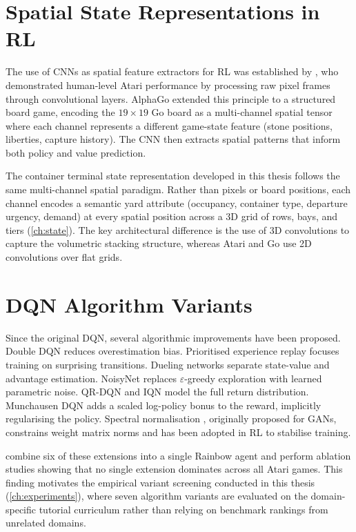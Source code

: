 \section{Spatial State Representations in RL}
\label{sec:rw:cnn}

The use of CNNs as spatial feature extractors for RL was established by \textcite{mnih2015dqn}, who demonstrated human-level Atari performance by processing raw pixel frames through convolutional layers. AlphaGo \cite{silver2016go} extended this principle to a structured board game, encoding the $19 \times 19$ Go board as a multi-channel spatial tensor where each channel represents a different game-state feature (stone positions, liberties, capture history). The CNN then extracts spatial patterns that inform both policy and value prediction.

The container terminal state representation developed in this thesis follows the same multi-channel spatial paradigm. Rather than pixels or board positions, each channel encodes a semantic yard attribute (occupancy, container type, departure urgency, demand) at every spatial position across a 3D grid of rows, bays, and tiers (\cref{ch:state}). The key architectural difference is the use of 3D convolutions \cite{ji20133dcnn} to capture the volumetric stacking structure, whereas Atari and Go use 2D convolutions over flat grids.

\section{DQN Algorithm Variants}
\label{sec:rw:dqn}

Since the original DQN, several algorithmic improvements have been proposed. Double DQN \cite{hasselt2016ddqn} reduces overestimation bias. Prioritised experience replay \cite{schaul2016per} focuses training on surprising transitions. Dueling networks \cite{wang2016dueling} separate state-value and advantage estimation. NoisyNet \cite{fortunato2018noisy} replaces $\varepsilon$-greedy exploration with learned parametric noise. QR-DQN \cite{dabney2018distributional} and IQN \cite{dabney2018implicit} model the full return distribution. Munchausen DQN \cite{vieillard2020munchausen} adds a scaled log-policy bonus to the reward, implicitly regularising the policy. Spectral normalisation \cite{miyato2018spectral}, originally proposed for GANs, constrains weight matrix norms and has been adopted in RL to stabilise training.

\textcite{hessel2018rainbow} combine six of these extensions into a single Rainbow agent and perform ablation studies showing that no single extension dominates across all Atari games. This finding motivates the empirical variant screening conducted in this thesis (\cref{ch:experiments}), where seven algorithm variants are evaluated on the domain-specific tutorial curriculum rather than relying on benchmark rankings from unrelated domains.

